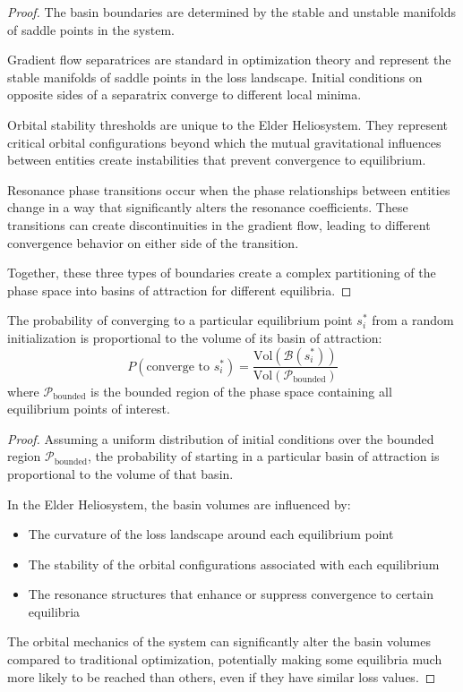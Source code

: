 \begin{proof}
The basin boundaries are determined by the stable and unstable manifolds of saddle points in the system.

Gradient flow separatrices are standard in optimization theory and represent the stable manifolds of saddle points in the loss landscape. Initial conditions on opposite sides of a separatrix converge to different local minima.

Orbital stability thresholds are unique to the Elder Heliosystem. They represent critical orbital configurations beyond which the mutual gravitational influences between entities create instabilities that prevent convergence to equilibrium.

Resonance phase transitions occur when the phase relationships between entities change in a way that significantly alters the resonance coefficients. These transitions can create discontinuities in the gradient flow, leading to different convergence behavior on either side of the transition.

Together, these three types of boundaries create a complex partitioning of the phase space into basins of attraction for different equilibria.
\end{proof}

\begin{theorem}
The probability of converging to a particular equilibrium point $s_i^*$ from a random initialization is proportional to the volume of its basin of attraction:
\begin{equation}
P(\text{converge to } s_i^*) = \frac{\text{Vol}(\mathcal{B}(s_i^*))}{\text{Vol}(\mathcal{P}_{\text{bounded}})}
\end{equation}
where $\mathcal{P}_{\text{bounded}}$ is the bounded region of the phase space containing all equilibrium points of interest.
\end{theorem}

\begin{proof}
Assuming a uniform distribution of initial conditions over the bounded region $\mathcal{P}_{\text{bounded}}$, the probability of starting in a particular basin of attraction is proportional to the volume of that basin.

In the Elder Heliosystem, the basin volumes are influenced by:
\begin{itemize}
    \item The curvature of the loss landscape around each equilibrium point
    \item The stability of the orbital configurations associated with each equilibrium
    \item The resonance structures that enhance or suppress convergence to certain equilibria
\end{itemize}

The orbital mechanics of the system can significantly alter the basin volumes compared to traditional optimization, potentially making some equilibria much more likely to be reached than others, even if they have similar loss values.
\end{proof}


